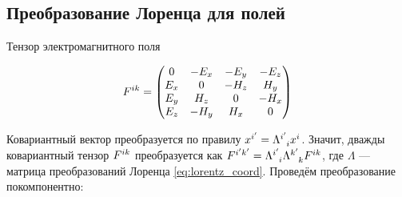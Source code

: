 \documentclass{article}
\begin{document}
\subsection{Преобразование Лоренца для полей}

Тензор электромагнитного поля

\begin{equation}\label{eq:f_tensor}
    \tensor{F}{^i^k} =
    \begin{pmatrix}
        0 & -E_x & -E_y & -E_z \\
        E_x & 0 & -H_z & H_y \\
        E_y & H_z & 0 & -H_x \\
        E_z & -H_y & H_x & 0
    \end{pmatrix}
\end{equation}

Ковариантный вектор преобразуется по правилу $x^{i'}=\tensor{\Lambda}{^{i'}_{i}} x^i$. Значит, дважды ковариантный тензор $\tensor{F}{^i^k}$ преобразуется как $\tensor{F}{^{i'}^{k'}}=\tensor{\Lambda}{^{i'}_{i}}\tensor{\Lambda}{^{k'}_{k}} \tensor{F}{^i^k}$, где $\Lambda$ --- матрица преобразований Лоренца \eqref{eq:lorentz_coord}. Проведём преобразование покомпонентно:
\end{document}
